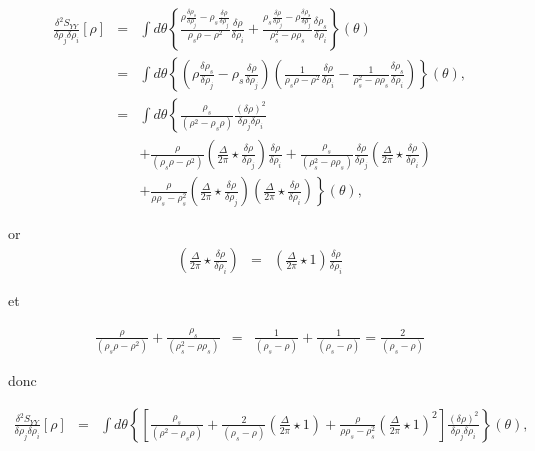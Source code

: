 	\begin{eqnarray}
		\frac{ \delta^2 S_{YY} }{ \delta \rho_j\delta \rho_i } [\rho ]  & = &\int  d\theta\left \{ \frac{\rho \frac{\delta \rho_s}{\delta \rho_j}- \rho_s\frac{\delta \rho}{\delta \rho_j}}{\rho_s\rho -\rho^2 }\frac{\delta \rho}{\delta \rho_i}  + \frac{\rho_s \frac{\delta \rho}{\delta \rho_j}- \rho\frac{\delta \rho_s}{\delta \rho_j}}{\rho_s^2 - \rho\rho_s}\frac{\delta \rho_s}{\delta \rho_i} \right \}(\theta) \\	
		& = & 	\int  d\theta\left \{ \left ( \rho \frac{\delta \rho_s}{\delta \rho_j}- \rho_s\frac{\delta \rho}{\delta \rho_j} \right ) \left ( \frac{1}{\rho_s\rho -\rho^2 }\frac{\delta \rho}{\delta \rho_i}  - \frac{1}{\rho_s^2 - \rho\rho_s}\frac{\delta \rho_s}{\delta \rho_i} \right )  \right \}(\theta),\\
		& = & \int  d\theta\left \{  \frac{\rho_s}{(\rho^2  - \rho_s\rho)} \frac{(\delta \rho)^2}{\delta \rho_j \delta \rho_i} \right . \\
		&  &  +  \left . \frac{\rho }{(\rho_s\rho -\rho^2) } \left (  \frac{\Delta}{2\pi} \star\frac{\delta \rho}{\delta \rho_j}   \right ) \frac{\delta \rho}{\delta \rho_i}+ \frac{\rho_s }{( \rho_s^2 - \rho \rho_s) }\frac{\delta \rho}{\delta \rho_j} \left (  \frac{\Delta}{2\pi} \star\frac{\delta \rho}{\delta \rho_i} \right )  \right . \\
		& & + \left .  \frac{\rho }{\rho\rho_s - \rho_s^2 }\left (  \frac{\Delta}{2\pi} \star\frac{\delta \rho}{\delta \rho_j} \right )\left (  \frac{\Delta}{2\pi} \star\frac{\delta \rho}{\delta \rho_i} \right )  \right \}(\theta),
	\end{eqnarray}
	
	or 
	\begin{eqnarray}
		\left (  \frac{\Delta}{2\pi} \star\frac{\delta \rho}{\delta \rho_i} \right ) & = & \left (  \frac{\Delta}{2\pi} \star 1  \right )	\frac{\delta \rho}{\delta \rho_i} 
	\end{eqnarray}
	
	et 
	
	\begin{eqnarray}
		\frac{\rho }{(\rho_s\rho -\rho^2) } + \frac{\rho_s }{( \rho_s^2 - \rho \rho_s) } & = & 	\frac{1}{(\rho_s -\rho) } + 	\frac{1}{( \rho_s - \rho ) } = \frac{2}{( \rho_s - \rho ) }
	\end{eqnarray}
	
	donc 
	
	\begin{eqnarray}
		\frac{ \delta^2 S_{YY} }{ \delta \rho_j\delta \rho_i } [\rho ] & = & 	\int  d\theta\left \{  \left [  \frac{\rho_s}{(\rho^2  - \rho_s\rho)}  +  \frac{2}{( \rho_s - \rho ) } \left (  \frac{\Delta}{2\pi} \star 1    \right )  +  \frac{\rho }{\rho\rho_s - \rho_s^2 }\left (  \frac{\Delta}{2\pi} \star 1 \right )^2  \right ]   \frac{(\delta \rho)^2}{\delta \rho_j \delta \rho_i} \right \}(\theta),
	\end{eqnarray}
	
